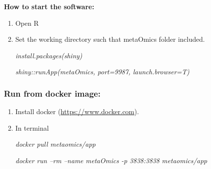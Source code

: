 \noindent\textbf{How to start the software:}

\begin{enumerate}
\item Open R 
\item Set the working directory such that metaOmics folder included. 

\textit{install.packages(\textquotesingle shiny\textquotesingle)}

\textit{shiny::runApp(\textquotesingle metaOmics\textquotesingle, port=9987, launch.browser=T)}
\end{enumerate}


\subsubsection{Run from docker image:}

\begin{enumerate}
\item Install docker (\url{https://www.docker.com}).
\item In terminal

\textit{docker pull metaomics/app}

\textit{docker run --rm --name metaOmics -p 3838:3838 metaomics/app}

\end{enumerate}


